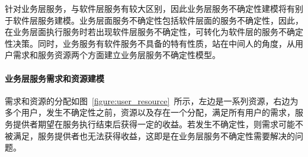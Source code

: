 
%
%
%
%
%
%
%
%
%
%

针对业务层服务，与软件层服务有较大区别，因此业务层服务不确定性建模将有别于软件层服务建模。业务层面服务不确定性包括软件层面的服务不确定性，因此，在业务层面执行服务时若出现软件层服务不确定性，可转化为软件层的服务不确定性决策。同时，业务服务有软件服务不具备的特有性质，站在中间人的角度，从用户需求和服务资源两个方面建立业务层服务不确定性模型。

\setcounter{paragraph}{0}
\paragraph{业务层服务需求和资源建模}

需求和资源的分配如图~\ref{figure:user_resource}~所示，左边是一系列资源，右边为多个用户，发生不确定性之前，资源以及存在一个分配，满足所有用户的需求，服务提供者期望在服务执行结束后获得一定的收益。若发生不确定性，则需求可能不被满足，服务提供者也无法获得收益，这即是在业务层服务不确定性需要解决的问题。

